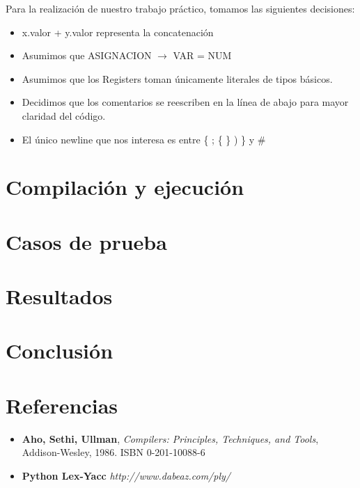 \documentclass[10pt,a4paper]{article}
\begin{document}
Para la realización de nuestro trabajo práctico, tomamos las siguientes decisiones:
\begin{itemize}

\item x.valor + y.valor representa la concatenación

\item Asumimos que ASIGNACION $\rightarrow$ VAR = NUM 

\item Asumimos que los Registers toman únicamente literales de tipos básicos.

\item Decidimos que los comentarios se reescriben en la línea de abajo para mayor claridad del código.

\item El único newline que nos interesa es entre \{ ; \{ \} ) \} y \#
\end{itemize}


\section{Compilación y ejecución}

\section{Casos de prueba}

\section{Resultados}

\section{Conclusión}

\section{Referencias}
\begin{itemize}
\item \textbf{Aho, Sethi, Ullman}, \textit{Compilers: Principles, Techniques, and Tools}, Addison-Wesley, 1986. ISBN 0-201-10088-6

\item \textbf{Python Lex-Yacc} \textit{http://www.dabeaz.com/ply/}
\end{itemize}
\end{document}
